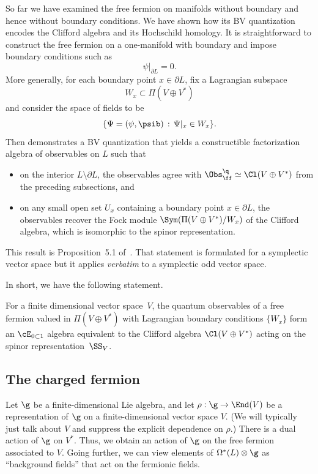 \documentclass[10pt]{amsart}
\begin{document}
So far we have examined the free fermion on manifolds without boundary and hence without boundary conditions.
We have shown how its BV quantization encodes the Clifford algebra and its Hochschild homology.
It is straightforward to construct the free fermion on a one-manifold with boundary and impose boundary conditions such as
\[
\psi|_{\partial L} = 0.
\]
More generally, for each boundary point $x \in \partial L$,
fix a Lagrangian subspace
\[
W_x \subset \Pi (V \oplus V^*)
\]
and consider the space of fields to be 
\[
\{ \Psi = (\psi, \psib) \,:\, \Psi|_x \in W_x\}.
\]
Then \cite{GRW} demonstrates a BV quantization that yields a constructible factorization algebra of observables on $L$ such that
\begin{itemize}
\item on the interior $L \setminus \partial L$, the observables agree with $\Obs^\q_\ff \simeq \Cl(V \oplus V^*)$ from the preceding subsections, and
\item on any small open set $U_x$ containing a boundary point $x \in \partial L$, the observables recover the Fock module $\Sym(\Pi(V \oplus V^*)/W_x)$ of the Clifford algebra,
which is isomorphic to the spinor representation.
\end{itemize}
This result is Proposition~5.1 of~\cite{GRW}.
That statement is formulated for a symplectic vector space but it applies {\it verbatim} to a symplectic odd vector space.

In short, we have the following statement.

\begin{lmm}
For a finite dimensional vector space~$V$,
the quantum observables of a free fermion valued in $\Pi(V \oplus V^*)$ with Lagrangian boundary conditions $\{W_x\}$ form an $\cE_{0 \subset 1}$ algebra equivalent to the Clifford algebra $\Cl(V \oplus V^*)$ acting on the spinor representation~$\SS_V$.
\end{lmm}

\subsection{The charged fermion}

Let $\g$ be a finite-dimensional Lie algebra, 
and let $\rho: \g \to \End(V)$ be a representation of $\g$ on a finite-dimensional vector space $V$.
(We will typically just talk about $V$ and suppress the explicit dependence on $\rho$.)
There is a dual action of $\g$ on $V^*$.
Thus, we obtain an action of $\g$ on the free fermion associated to $V$.
Going further, we can view elements of $\Omega^*(L) \otimes \g$ as ``background fields'' that act on the fermionic fields.
\end{document}
